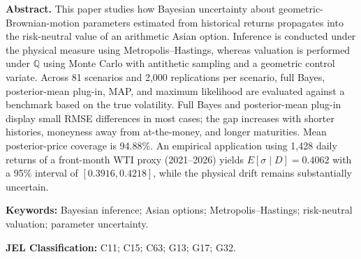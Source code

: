 \documentclass[12pt,letterpaper]{article}
\begin{document}
\textbf{Abstract.} This paper studies how Bayesian uncertainty about geometric-Brownian-motion parameters estimated from historical returns propagates into the risk-neutral value of an arithmetic Asian option. Inference is conducted under the physical measure using Metropolis--Hastings, whereas valuation is performed under $\mathbb Q$ using Monte Carlo with antithetic sampling and a geometric control variate. Across 81 scenarios and 2,000 replications per scenario, full Bayes, posterior-mean plug-in, MAP, and maximum likelihood are evaluated against a benchmark based on the true volatility. Full Bayes and posterior-mean plug-in display small RMSE differences in most cases; the gap increases with shorter histories, moneyness away from at-the-money, and longer maturities. Mean posterior-price coverage is 94.88\%. An empirical application using 1,428 daily returns of a front-month WTI proxy (2021--2026) yields $E[\sigma\mid D]=0.4062$ with a 95\% interval of $[0.3916,0.4218]$, while the physical drift remains substantially uncertain.

\textbf{Keywords:} Bayesian inference; Asian options; Metropolis--Hastings; risk-neutral valuation; parameter uncertainty.

\textbf{JEL Classification:} C11; C15; C63; G13; G17; G32.








\end{document}
